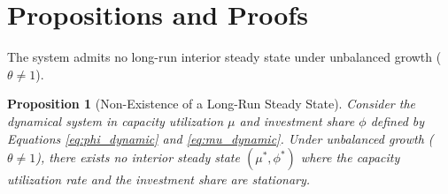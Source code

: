 \documentclass[12pt, a4paper]{article}
\newtheorem{proposition}{Proposition}
\theoremstyle{definition}
\theoremstyle{remark}
\begin{document}
\section{Propositions and Proofs}

The system admits no long-run interior steady state under unbalanced growth ($\theta \neq 1$).

\begin{proposition}[Non-Existence of a Long-Run Steady State] \label{prop:non_existence}
Consider the dynamical system in capacity utilization $\mu$ and investment share $\phi$ defined by Equations \eqref{eq:phi_dynamic} and \eqref{eq:mu_dynamic}. Under unbalanced growth ($\theta \neq 1$), there exists no interior steady state $(\mu^*, \phi^*)$ where the capacity utilization rate and the investment share are stationary.
\end{proposition}
\end{document}
